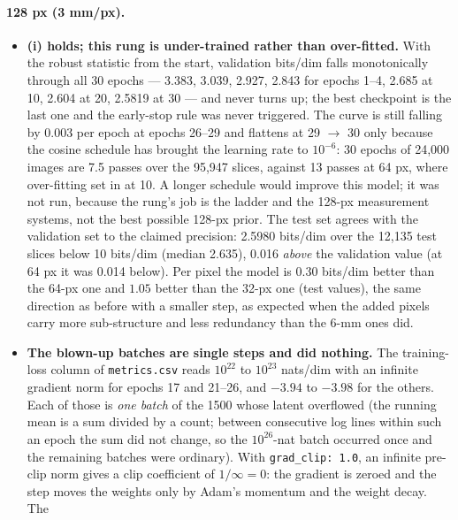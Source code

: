 \documentclass[11pt]{article}
\begin{document}
\paragraph{128 px (3 mm/px).}
\begin{itemize}
  \item \textbf{(i) holds; this rung is under-trained rather than
        over-fitted.} With the robust statistic from the start, validation
        bits/dim falls monotonically through all 30 epochs --- 3.383, 3.039,
        2.927, 2.843 for epochs 1--4, 2.685 at 10, 2.604 at 20, 2.5819 at 30
        --- and never turns up; the best checkpoint is the last one and the
        early-stop rule was never triggered. The curve is still falling by
        0.003 per epoch at epochs 26--29 and flattens at 29 $\to$ 30 only
        because the cosine schedule has brought the learning rate to
        $10^{-6}$: 30 epochs of 24,000 images are 7.5 passes over the
        95,947 slices, against 13 passes at 64 px, where over-fitting set in
        at 10. A longer schedule would improve this model; it was not run,
        because the rung's job is the ladder and the 128-px measurement
        systems, not the best possible 128-px prior. The test set agrees
        with the validation set to the claimed precision: 2.5980 bits/dim
        over the 12,135 test slices below 10 bits/dim (median 2.635), 0.016
        \emph{above} the validation value (at 64 px it was 0.014 below). Per
        pixel the model is $0.30$ bits/dim better than the 64-px one and
        $1.05$ better than the 32-px one (test values), the same direction as before with
        a smaller step, as expected when the added pixels carry more
        sub-structure and less redundancy than the 6-mm ones did.
  \item \textbf{The blown-up batches are single steps and did nothing.} The
        training-loss column of \texttt{metrics.csv} reads $10^{22}$ to
        $10^{23}$ nats/dim with an infinite gradient norm for epochs 17 and
        21--26, and $-3.94$ to $-3.98$ for the others. Each of those is
        \emph{one batch} of the 1500 whose latent overflowed (the running
        mean is a sum divided by a count; between consecutive log lines
        within such an epoch the sum did not change, so the $10^{26}$-nat
        batch occurred once and the remaining batches were ordinary). With
        \texttt{grad\_clip: 1.0}, an infinite pre-clip norm gives a clip
        coefficient of $1/\infty = 0$: the gradient is zeroed and the step
        moves the weights only by Adam's momentum and the weight decay. The

\end{itemize}
\end{document}
